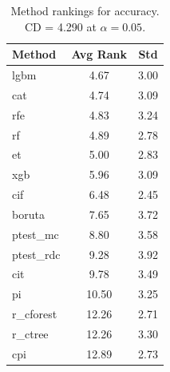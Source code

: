 \begin{table}[h]
\centering
\caption{Method rankings for accuracy. CD = 4.290 at $\alpha=0.05$.}
\label{tab:ranks_accuracy}
\begin{tabular}{lcc}
\toprule
Method & Avg Rank & Std \\
\midrule
lgbm & 4.67 & 3.00 \\
cat & 4.74 & 3.09 \\
rfe & 4.83 & 3.24 \\
rf & 4.89 & 2.78 \\
et & 5.00 & 2.83 \\
xgb & 5.96 & 3.09 \\
cif & 6.48 & 2.45 \\
boruta & 7.65 & 3.72 \\
ptest_mc & 8.80 & 3.58 \\
ptest_rdc & 9.28 & 3.92 \\
cit & 9.78 & 3.49 \\
pi & 10.50 & 3.25 \\
r_cforest & 12.26 & 2.71 \\
r_ctree & 12.26 & 3.30 \\
cpi & 12.89 & 2.73 \\
\bottomrule
\end{tabular}
\end{table}